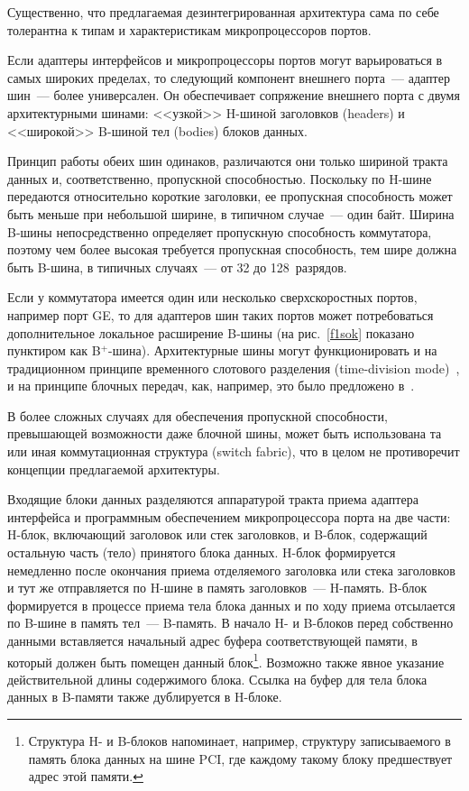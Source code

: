 \begin{multicols}{2}
{}

Существенно, что предлагаемая дезинтегрированная архитектура сама по себе
толерантна к типам и характеристикам микропроцессоров портов.

    Если адаптеры интерфейсов и микропроцессоры портов могут варьироваться в самых
широких пределах, то следующий компонент внешнего порта~--- адаптер шин~--- более
универсален. Он обеспечивает сопряжение внешнего порта с двумя %
архитектурными шинами:
<<узкой>> H-ши\-ной заголовков (headers) и <<широкой>> B-ши\-ной тел (bodies) блоков данных.

Принцип работы обеих шин одинаков, различаются они только шириной тракта данных и,
соответственно, пропускной способностью. Поскольку по H-шине передаются относительно
короткие заголовки, ее пропускная спо\-собность может быть меньше при небольшой ширине, в
типичном случае~--- один байт. Ширина B-шины непосредственно определяет пропускную
способность коммутатора, поэтому чем более высокая требуется пропускная способность, тем
шире должна быть B-шина, в типичных случаях~--- от 32 до 128~разрядов. 

Если у коммутатора
имеется один или несколько сверхскоростных портов, например порт GE, то для адаптеров шин
таких портов может потребоваться дополнительное локальное расширение B-шины (на
рис.~\ref{f1sok} показано пунктиром как B$^+$-шина). Архитектурные шины могут
функционировать и на традиционном принципе временного слотового разделения (time-division
mode)~\cite{6sok}, и на принципе блочных передач, как, например, это было предложено
в~\cite{7sok}. 

В более сложных случаях для обеспечения пропускной способности,
пре\-вы\-ша\-ющей возможности даже блочной шины, может быть использована та или иная
коммутационная структура (switch fabric), что в целом не противоречит концепции
предлагаемой архитектуры.

    Входящие блоки данных разделяются аппаратурой тракта приема адаптера интерфейса и
программным обеспечением микропроцессора порта на две части: H-блок, включающий
заголовок или стек заголовков, и B-блок, содержащий остальную часть (тело) принятого блока
данных. H-блок формируется немедленно после окончания приема отделяемого заголовка или
стека заголовков и тут же отправляется по H-шине в память заголовков~--- H-память. B-блок
формируется в процессе приема тела блока данных и по ходу приема отсылается по B-шине в
память тел~--- B-память. В начало H- и B-блоков перед собственно данными вставляется
начальный адрес буфера соответствующей памяти, в который должен быть помещен данный
блок\footnote{Структура H- и B-блоков напоминает, например, структуру записываемого в память блока данных
на шине PCI, где каждому такому блоку предшествует адрес этой памяти.}. Возможно также явное указание
действительной длины содержимого блока. Ссылка на буфер для тела блока данных в B-памяти
также дублируется в H-блоке.


\end{multicols}
